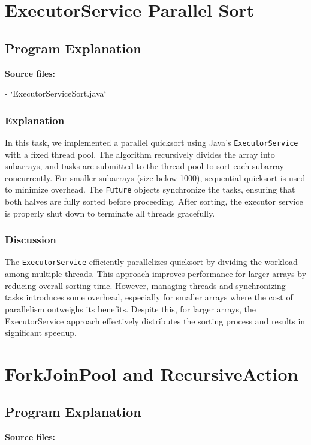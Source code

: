 \documentclass{article}
\begin{document}
\newpage
\section{ExecutorService Parallel Sort}

\subsection{Program Explanation}
\textbf{Source files:}

- `ExecutorServiceSort.java`

\subsubsection{Explanation}
In this task, we implemented a parallel quicksort using Java’s \texttt{ExecutorService} with a fixed thread pool. The algorithm recursively divides the array into subarrays, and tasks are submitted to the thread pool to sort each subarray concurrently. For smaller subarrays (size below 1000), sequential quicksort is used to minimize overhead. The \texttt{Future} objects synchronize the tasks, ensuring that both halves are fully sorted before proceeding. After sorting, the executor service is properly shut down to terminate all threads gracefully.

\subsubsection{Discussion}
The \texttt{ExecutorService} efficiently parallelizes quicksort by dividing the workload among multiple threads. This approach improves performance for larger arrays by reducing overall sorting time. However, managing threads and synchronizing tasks introduces some overhead, especially for smaller arrays where the cost of parallelism outweighs its benefits. Despite this, for larger arrays, the ExecutorService approach effectively distributes the sorting process and results in significant speedup.



\newpage
\section{ForkJoinPool and RecursiveAction}

\subsection{Program Explanation}
\textbf{Source files:}
\end{document}
